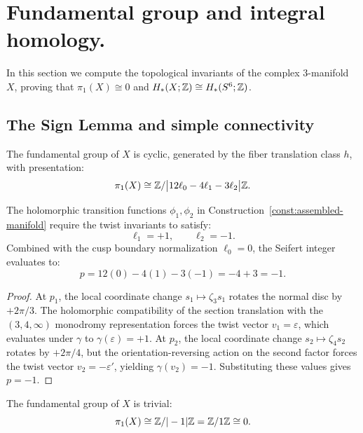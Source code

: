 \section{Fundamental group and integral homology.}

In this section we compute the topological invariants of the complex $3$-manifold $X$, proving that $\pi_1(X) \cong 0$ and $H_*(X; \mathbb{Z}) \cong H_*(S^6; \mathbb{Z})$.

\subsection{The Sign Lemma and simple connectivity}

\begin{theorem}\label{thm:seifert-pi1}
The fundamental group of $X$ is cyclic, generated by the fiber translation class $h$, with presentation:
\[
\pi_1(X) \cong \mathbb{Z} / \big| 12\ell_0 - 4\ell_1 - 3\ell_2 \big| \mathbb{Z}.
\]
\end{theorem}

\begin{lemma}\label{lem:sign-lemma}
The holomorphic transition functions $\phi_1, \phi_2$ in Construction~\ref{const:assembled-manifold} require the twist invariants to satisfy:
\[
\ell_1 = +1, \qquad \ell_2 = -1.
\]
Combined with the cusp boundary normalization $\ell_0 = 0$, the Seifert integer evaluates to:
\[
p = 12(0) - 4(1) - 3(-1) = -4 + 3 = -1.
\]
\end{lemma}

\begin{proof}
At $p_1$, the local coordinate change $s_1 \mapsto \zeta_3 s_1$ rotates the normal disc by $+2\pi/3$. The holomorphic compatibility of the section translation with the $(3,4,\infty)$ monodromy representation forces the twist vector $v_1 = \varepsilon$, which evaluates under $\gamma$ to $\gamma(\varepsilon) = +1$.
At $p_2$, the local coordinate change $s_2 \mapsto \zeta_4 s_2$ rotates by $+2\pi/4$, but the orientation-reversing action on the second factor forces the twist vector $v_2 = -\varepsilon'$, yielding $\gamma(v_2) = -1$.
Substituting these values gives $p = -1$.
\end{proof}

\begin{corollary}\label{cor:simple-connectivity}
The fundamental group of $X$ is trivial:
\[
\pi_1(X) \cong \mathbb{Z} / |-1|\mathbb{Z} = \mathbb{Z} / 1\mathbb{Z} \cong 0.
\]
\end{corollary}

